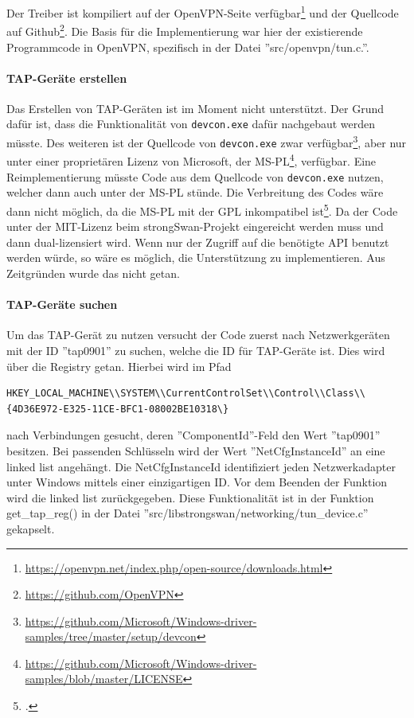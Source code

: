 {%
Der Treiber ist kompiliert auf der OpenVPN-Seite
verfügbar\footnote{\url{https://openvpn.net/index.php/open-source/downloads.html}}
und der Quellcode auf Github\footnote{\url{https://github.com/OpenVPN}}.
Die Basis für die Implementierung war hier der existierende Programmcode in
OpenVPN, spezifisch in  der Datei ''src/openvpn/tun.c.''.

\paragraph{TAP-Geräte erstellen}
Das Erstellen von TAP-Geräten ist im Moment nicht unterstützt. Der Grund dafür ist,
dass die Funktionalität von \texttt{devcon.exe} dafür nachgebaut werden müsste.
Des weiteren ist der Quellcode von \texttt{devcon.exe} zwar verfügbar\footnote{\url{https://github.com/Microsoft/Windows-driver-samples/tree/master/setup/devcon}},
aber nur unter einer proprietären Lizenz von Microsoft, der MS-PL\footnote{\url{https://github.com/Microsoft/Windows-driver-samples/blob/master/LICENSE}},
verfügbar. Eine Reimplementierung müsste Code aus dem Quellcode von \texttt{devcon.exe} nutzen,
welcher dann auch unter der MS-PL stünde. Die Verbreitung des Codes wäre dann nicht möglich,
da die MS-PL mit der GPL inkompatibel ist\footcite[][]{_gnu.org_2016}.
Da der Code unter der MIT-Lizenz beim strongSwan-Projekt eingereicht werden muss
und dann dual-lizensiert wird.
Wenn nur der Zugriff auf die benötigte API benutzt werden würde, so wäre es möglich,
die Unterstützung zu implementieren. Aus Zeitgründen wurde das nicht getan.

\paragraph{TAP-Geräte suchen}
Um das TAP-Gerät zu nutzen versucht der Code zuerst nach Netzwerkgeräten mit der ID ''tap0901'' zu suchen,
welche die ID für TAP-Geräte ist. Dies wird über die Registry getan. Hierbei wird
im Pfad \begin{lstlisting}[numbers=none]
HKEY_LOCAL_MACHINE\\SYSTEM\\CurrentControlSet\\Control\\Class\\{4D36E972-E325-11CE-BFC1-08002BE10318\}
\end{lstlisting}
nach Verbindungen gesucht, deren ''ComponentId''-Feld den Wert ''tap0901'' besitzen.
Bei passenden Schlüsseln wird der Wert ''NetCfgInstanceId'' an eine linked list
angehängt. Die NetCfgInstanceId identifiziert jeden Netzwerkadapter unter Windows
mittels einer einzigartigen ID.
Vor dem Beenden der Funktion wird die linked list zurückgegeben.
Diese Funktionalität ist in der Funktion get\_tap\_reg() in der Datei
''src/libstrongswan/networking/tun\_device.c'' gekapselt.

}
